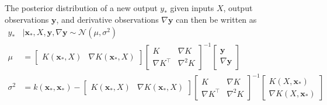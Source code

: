 \documentclass{article}
\newcommand{\mat}[1]{\begin{bmatrix}#1\end{bmatrix}}
\renewcommand{\vec}[1]{\mathbf{#1}}
\newcommand{\N}{\mathcal{N}}
\numberwithin{equation}{section}
\begin{document}
The posterior distribution of a new output $y_*$ given inputs $X$, output observations $\vec{y}$, and derivative observations $\nabla \vec{y}$ can then be written as
\begin{align}
    y_* &| \vec{x}_*,X,\vec{y},\nabla\vec{y} \sim \N(\mu, \sigma^2) \nonumber \\
    \mu & = \mat{K(\vec{x}_*, X) & \nabla K(\vec{x}_*, X)}
    \mat{K & \nabla K \\ \nabla K^\top & \nabla^2 K}^{-1}
    \mat{\vec{y} \\ \nabla \vec{y}} \label{eq:posterior-mean-der} \\
    \sigma^2 & = k(\vec{x}_*, \vec{x}_*) - \mat{K(\vec{x}_*, X) & \nabla K(\vec{x}_*, X)}\mat{K & \nabla K \\ \nabla K^\top & \nabla^2 K}^{-1}\mat{K(X, \vec{x}_*) \\ \nabla K(X, \vec{x}_*)} \label{eq:posterior-var-der}
\end{align}
\end{document}
